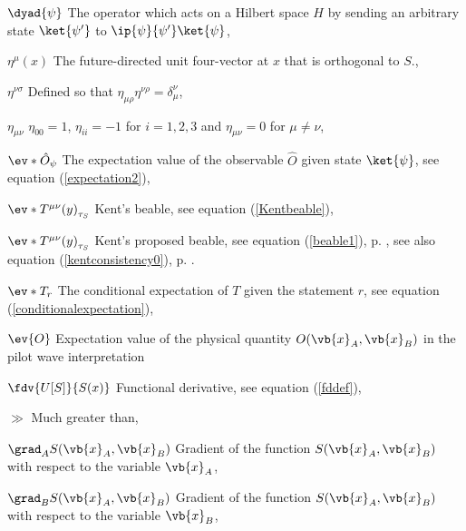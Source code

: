 \begin{thenomenclature}
  \item [{$\dyad{\psi}$}]\begingroup The operator which acts on a Hilbert space $H$ by sending an arbitrary state $\ket{\psi'}$ to $\ip{\psi}{\psi'}\ket{\psi}$, \nomrefpage{}
  \item [{$\eta^\mu(x)$}]\begingroup The future-directed  unit four-vector at $x$ that is orthogonal to $S$., \nomrefpage{}
  \item [{$\eta^{\nu\sigma}$}]\begingroup Defined so that  $\eta_{\mu\rho}\eta^{\nu\rho}=\delta^\nu_\mu$, \nomrefpage{}
  \item [{$\eta_{\mu\nu}$}]\begingroup $\eta_{00}=1$, $\eta_{ii}=-1$ for $i=1,2,3$ and $\eta_{\mu\nu}=0$ for $\mu\neq\nu$, \nomrefpage{}
  \item [{$\ev*{\hat{O}}_\psi$}]\begingroup The expectation value of the observable $\hat{O}$ given state $\ket{\psi}$, see equation (\ref{expectation2}), \nomrefpage{}
  \item [{$\ev*{T^{\mu\nu}(y)}_{\tau_S}$}]\begingroup Kent's beable, see equation (\ref{Kentbeable}), \nomrefpage{}
  \item [{$\ev*{T^{\mu\nu}(y)}_{\tau_S}$}]\begingroup Kent's proposed beable, see equation (\ref{beable1}), p. \pageref{beable1}, see also equation (\ref{kentconsistency0}), p. \pageref{kentconsistency0}.
  \item [{$\ev*{T}_r$}]\begingroup The conditional expectation of $T$ given the statement $r$, see equation (\ref{conditionalexpectation}), \nomrefpage{}
  \item [{$\ev{O}$}]\begingroup Expectation value of the physical quantity $O(\vb{x}_A, \vb{x}_B)$ in the pilot wave interpretation \nomrefpage{}
  \item [{$\fdv {U[S]}{S(x)}$}]\begingroup Functional derivative, see equation (\ref {fddef}), \nomrefpage {}
  \item [{$\gg$}]\begingroup Much greater than, \nomrefpage{}
  \item [{$\grad_A{S}(\vb{x}_A, \vb{x}_B)$}]\begingroup Gradient of the function ${S}(\vb{x}_A, \vb{x}_B)$ with respect to the variable $\vb{x}_A$, \nomrefpage{}
  \item [{$\grad_B{S}(\vb{x}_A, \vb{x}_B)$}]\begingroup Gradient of the function ${S}(\vb{x}_A, \vb{x}_B)$ with respect to the variable $\vb{x}_B$, \nomrefpage{}

\end{thenomenclature}
